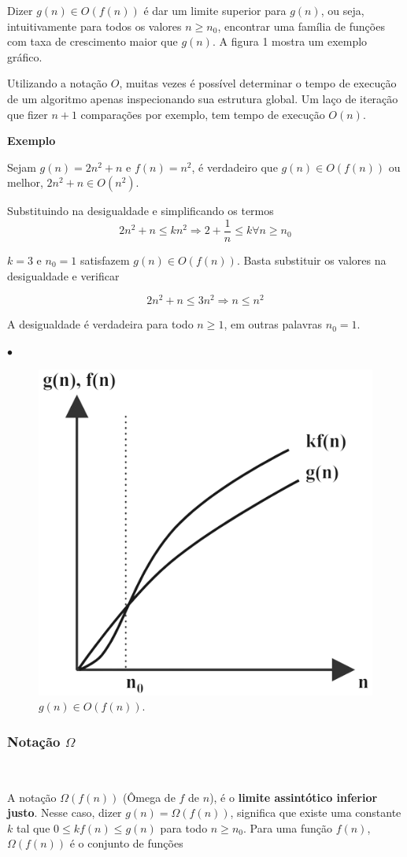 Dizer $g(n) \in O(f(n))$ é dar um limite superior para $g(n)$, ou seja, intuitivamente para todos os valores $n\geq n_0$, encontrar uma família de funções com taxa de crescimento maior que $g(n)$. A figura 1 mostra um exemplo gráfico.

Utilizando a notação $O$, muitas vezes é possível determinar o tempo de execução de um algoritmo apenas inspecionando sua estrutura global. Um laço de iteração que fizer $n + 1$ comparações por exemplo, tem tempo de execução $O(n)$.

\textbf{Exemplo}

Sejam $g(n)=2n^2 + n$ e $f(n)=n^2$, é verdadeiro que $g(n)\in O(f(n))$ ou melhor, $2n^2 + n \in O(n^2)$.

Substituindo na desigualdade e simplificando os termos
\[2n^2+n\leq kn^2 \Rightarrow 2 + \frac{1}{n}\leq k \forall n\geq n_0\]

$k=3$ e $n_0=1$ satisfazem $g(n)\in O(f(n))$. Basta substituir os valores na desigualdade e verificar

\[2n^2+n\leq 3n^2 \Rightarrow n\leq n^2\]

A desigualdade é verdadeira para todo $n\geq 1$, em outras palavras $n_0=1$.

{\raggedleft $\bullet$ \par}

\begin{figure}
  \centering
  \includegraphics[width=0.4\linewidth]{img/O(f(n)).png}
    \caption{$g(n)\in O(f(n))$.}
    \label{O(f(n))}
\end{figure}

\subsubsection{Notação $\Omega$}
\

A notação $\Omega(f(n))$ (Ômega de $f$ de $n$), é o \textbf{limite assintótico inferior justo}. Nesse caso, dizer $g(n)=\Omega(f(n))$, significa que existe uma constante $k$ tal que $0 \leq kf(n) \leq g(n)$ para todo $n \geq n_0$. Para uma função $f(n)$, $\Omega(f(n))$ é o conjunto de funções

